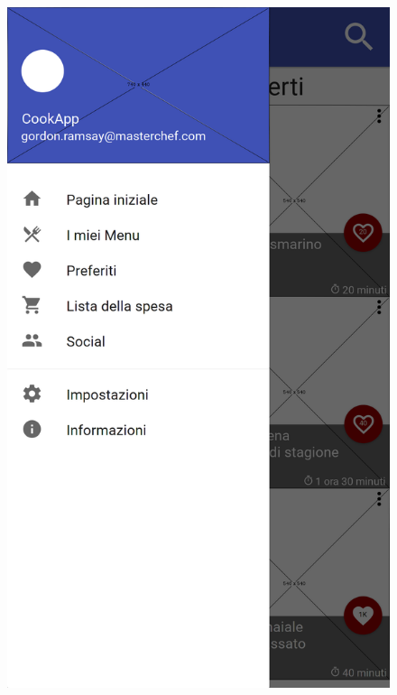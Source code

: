 \begin{figure}[H]
\begin{minipage}{.49\textwidth}
	\end{minipage}
	\begin{minipage}{.49\textwidth}
		\includegraphics[width=\textwidth]{img/wireframe/menu.png}
	\end{minipage}
\end{figure}
